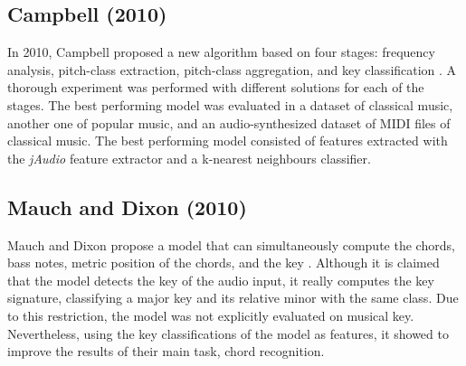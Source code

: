 \subsection{Campbell (2010)}
In 2010, Campbell proposed a new algorithm based on four stages: frequency analysis, pitch-class extraction, pitch-class aggregation, and key classification \cite{campbell_automatic_2010}. A thorough experiment was performed with different solutions for each of the stages. The best performing model was evaluated in a dataset of classical music, another one of popular music, and an audio-synthesized dataset of MIDI files of classical music. The best performing model consisted of features extracted with the \emph{jAudio} feature extractor and a k-nearest neighbours classifier.

\subsection{Mauch and Dixon (2010)}
Mauch and Dixon propose a model that can simultaneously compute the chords, bass notes, metric position of the chords, and the key \cite{mauch_simultaneous_2010}. Although it is claimed that the model detects the key of the audio input, it really computes the key signature, classifying a major key and its relative minor with the same class. Due to this restriction, the model was not explicitly evaluated on musical key. Nevertheless, using the key classifications of the model as features, it showed to improve the results of their main task, chord recognition.






